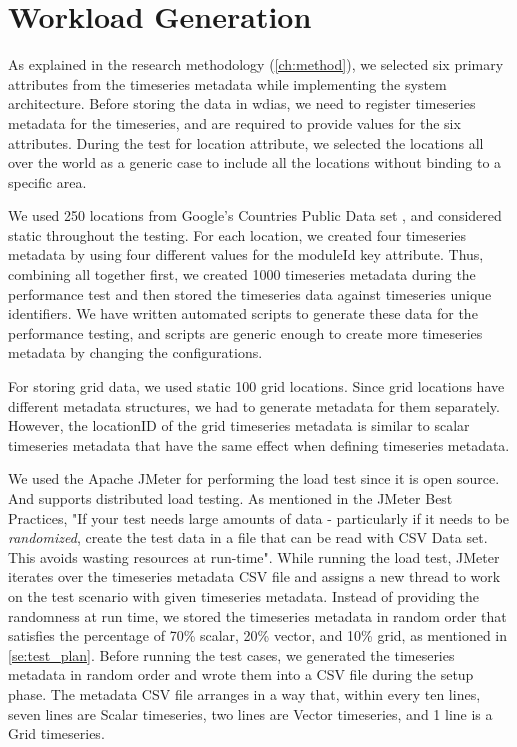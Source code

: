 \section{Workload Generation}
\label{se:workload}

As explained in the research methodology (\cref{ch:method}), we selected six primary attributes from the timeseries metadata while implementing the system architecture. Before storing the data in \acrshort{wdias}, we need to register timeseries metadata for the timeseries, and are required to provide values for the six attributes. During the test for location attribute, we selected the locations all over the world as a generic case to include all the locations without binding to a specific area.

We used 250 locations from Google’s Countries Public Data set \cite{GoogleGoogleCounties}, and considered static throughout the testing. For each location, we created four timeseries metadata by using four different values for the moduleId key attribute. Thus, combining all together first, we created 1000 timeseries metadata during the performance test and then stored the timeseries data against timeseries unique identifiers. We have written automated scripts to generate these data for the performance testing, and scripts are generic enough to create more timeseries metadata by changing the configurations.

For storing grid data, we used static 100 grid locations. Since grid locations have different metadata structures, we had to generate metadata for them separately. However, the locationID of the grid timeseries metadata is similar to scalar timeseries metadata that have the same effect when defining timeseries metadata.

We used the Apache JMeter for performing the load test since it is open source. And supports distributed load testing. As mentioned in the JMeter Best Practices, "If your test needs large amounts of data - particularly if it needs to be \emph{randomized}, create the test data in a file that can be read with CSV Data set. This avoids wasting resources at run-time". While running the load test, JMeter iterates over the timeseries metadata CSV file and assigns a new thread to work on the test scenario with given timeseries metadata. Instead of providing the randomness at run time, we stored the timeseries metadata in random order that satisfies the percentage of 70\% scalar, 20\% vector, and 10\% grid, as mentioned in \cref{se:test_plan}.
Before running the test cases, we generated the timeseries metadata in random order and wrote them into a CSV file during the setup phase. The metadata CSV file arranges in a way that, within every ten lines, seven lines are Scalar timeseries, two lines are Vector timeseries, and 1 line is a Grid timeseries.

